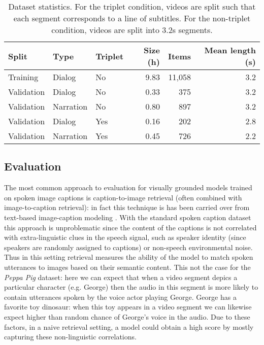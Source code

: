 \begin{table}
  \centering
  \begin{tabular}{lllrrr}
    \toprule
    Split      & Type      & Triplet   & Size (h) & Items & Mean
                                                            length
                                                            (s)\\\midrule
    Training   & Dialog    & No        & 9.83     & 11,058 & 3.2 \\
    Validation & Dialog    & No        & 0.33     & 375    & 3.2 \\
    Validation & Narration & No        & 0.80     & 897    & 3.2 \\
    Validation & Dialog    & Yes       & 0.16     & 202    & 2.8 \\
    Validation & Narration & Yes       & 0.45     & 726    & 2.2 \\
    \bottomrule
  \end{tabular}
  \caption{Dataset statistics. For the triplet condition, videos are
    split such that each segment corresponds to a line of
    subtitles. For the non-triplet condition, videos are split into
    3.2s segments.}
  \label{tab:ds-stat}
\end{table}


\subsection{Evaluation}
\label{sec:eval}
The most common approach to evaluation for visually grounded models
trained on spoken image captions is caption-to-image retrieval (often
combined with image-to-caption retrieval): in fact this technique is
has been carried over from text-based image-caption modeling
\citet{chrupala-visually-2021}.
 With the
standard spoken caption dataset this approach is unproblematic since
the content of the captions is not correlated with extra-linguistic
clues in the speech signal, such as speaker identity (since speakers
are randomly assigned to captions) or non-speech environmental
noise. Thus in this setting retrieval measures the ability of the
model to match spoken utterances to images based on their semantic
content. This not the case for the {\it Peppa Pig} dataset: here we
can expect that when a video segment depics a particular character
(e.g. George) then the audio in this segment is more likely to contain
utterances spoken by the voice actor playing George. George has a
favorite toy dinosaur: when this toy appears in a video segment we can
likewise expect higher than random chance of George's voice in the
audio. Due to these factors, in a naive retrieval setting, a model
could obtain a high score by mostly capturing these non-linguistic
correlations.

